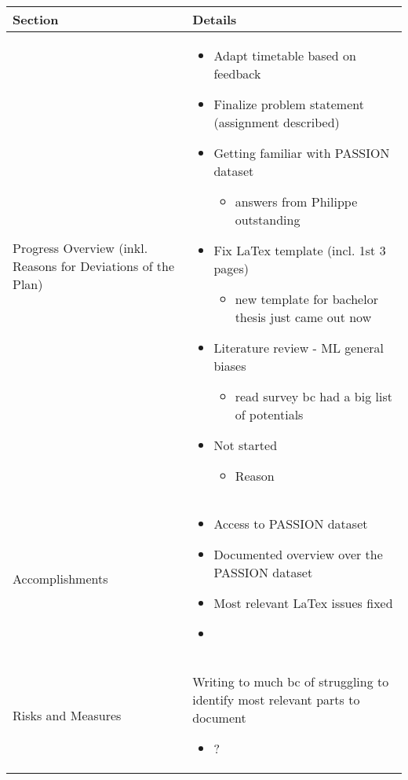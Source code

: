 \documentclass[a4paper,11pt]{article}
\newcommand{\done}{\textcolor{green}{\ding{52}}}
\newcommand{\ongoing}{\textcolor{orange}{\ding{45}}}
\newcommand{\notstarted}{\textcolor{red}{\ding{56}}}
\begin{document}
	
	\renewcommand{\arraystretch}{1.5}
	\begin{longtable}{|p{4cm}|p{10cm}|}
		\hline
		\textbf{Section} & \textbf{Details} \\
		\hline
		Progress Overview (inkl. Reasons for Deviations of the Plan) & \begin{itemize}
			\item[\done] Adapt timetable based on feedback
			\item[\ongoing] Finalize problem statement (assignment described)
			\item[\ongoing] Getting familiar with PASSION dataset
			\begin{itemize}
				\item answers from Philippe outstanding
			\end{itemize}
			\item[\ongoing] Fix LaTex template (incl. 1st 3 pages)
			\begin{itemize}
				\item new template for bachelor thesis just came out now
			\end{itemize}
			\item[\ongoing] Literature review - ML general biases
			\begin{itemize}
				\item read survey bc had a big list of potentials
			\end{itemize}
			
			\item[\notstarted] Not started
			\begin{itemize}
				\item Reason
			\end{itemize}
		\end{itemize} \\
		\hline
		Accomplishments & \begin{itemize}
			\item[\done] Access to PASSION dataset
			\item[\done] Documented overview over the PASSION dataset
			\item[\done] Most relevant LaTex issues fixed
			\item[\done] 
		\end{itemize} \\
		\hline
		Risks and Measures & 
		Writing to much bc of struggling to identify most relevant parts to document
		\begin{itemize}
			\item ?
		\end{itemize}
		

\end{longtable}
\end{document}
